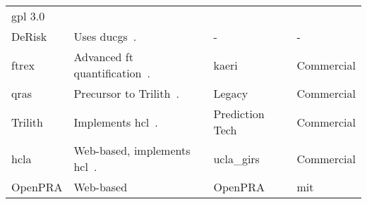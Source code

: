 \begin{table}
\begin{tabular}{@{}llll@{}}
  \acrshort{gpl} 3.0 \\
DeRisk &
  Uses \acrlong{ducg}s~\cite{derisk1,derisk2}. &
  - &
  - \\
\acrshort{ftrex} &
  Advanced \acrlong{ft} quantification~\cite{ftrex_manual}. &
  \acrshort{kaeri} &
  Commercial \\
\acrshort{qras} &
  Precursor to Trilith~\cite{qras}. &
  Legacy &
  Commercial \\
Trilith &
  Implements \acrfull{hcl}~\cite{hcl_method}. &
  Prediction Tech&
  Commercial \\
\acrshort{hcla} &
  Web-based, implements \acrshort{hcl}~\cite{hcla_cmd,hcla_web}. &
  \acrshort{ucla_girs} &
  Commercial \\
OpenPRA &
  Web-based&
  OpenPRA &
  \acrshort{mit} \\
\end{tabular}
\end{table}